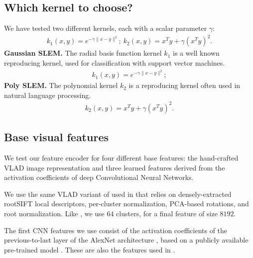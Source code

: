 \subsection{Which kernel to choose?}
We have tested two different kernels, each with a scalar parameter $\gamma$:
\begin{align}
    k_1(x,y) = e^{-\gamma\|x-y \|^2}; \ 
    k_2(x,y) = x^Ty+\gamma(x^Ty)^2. \label{kernels}
\end{align}
\textbf{Gaussian SLEM.} The radial basis function kernel $k_1$ is a
well known reproducing kernel, used for classification with support vector machines.\\
\begin{align}
    k_1(x,y) = e^{-\gamma\|x-y \|^2};
\end{align}
\textbf{Poly SLEM.} The polynomial kernel $k_2$ is a reproducing kernel often used in natural language processing.\\
\begin{align}
    k_2(x,y) = x^Ty+\gamma(x^Ty)^2.
\end{align}


\subsection{Base visual features}
We test our feature encoder for four different base features: the hand-crafted VLAD image representation and three learned features derived from the activation coefficients of deep Convolutional Neural Networks.

We use the same VLAD variant of \cite{Delhumeau2013} used in \cite{ZePe15} that relies on densely-extracted rootSIFT \cite{3things} local descriptors, per-cluster normalization, PCA-based rotations, and root normalization. Like \cite{ZePe15}, we use $64$ clusters, for a final feature of size $8192$.

The first CNN features we use consist of the activation coefficients of the previous-to-last layer of the AlexNet architecture \cite{Krizhevsky2012}, based on a publicly available pre-trained model \cite{jia2014caffe}. These are also the features used in \cite{ZePe15}.

